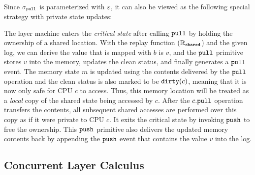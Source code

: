 Since $\sigma_{\mathrm{\texttt{pull}}}$ is parameterized with $\oracle$, it can also be viewed as the following special strategy  with private state updates:%
\begin{center}
\end{center}
The layer machine enters the \emph{critical state} after calling ${\mathrm{\texttt{pull}}}$ by holding the ownership
of a shared location.
With the replay function ($\mathbb{R}_{{\mathrm{\texttt{shared}}}}$) and the given log, 
we can derive the value that is mapped with $b$ is $v$, 
and the ${\mathrm{\texttt{pull}}}$ primitive
stores  $v$  into the memory, updates the clean status,
and finally generates a ${\mathrm{\texttt{pull}}}$ event.
The memory state $m$ is updated using the contents delivered
by the ${\mathrm{\texttt{pull}}}$ operation
and  the clean status is also marked to be ${\mathrm{\texttt{dirty}}}(c)$,
meaning that it is now only safe for CPU $c$ to access.
Thus, this memory location will be treated as
a \emph{local}
copy of the shared state being accessed by $c$.
After the $c.{\mathrm{\texttt{pull}}}$ operation transfers the contents,
all subsequent shared accesses are performed over this 
copy as if it were private to CPU $c$.
It exits the critical state by invoking ${\mathrm{\texttt{push}}}$ to free the ownership.
This ${\mathrm{\texttt{push}}}$ primitive also delivers the updated memory contents back 
by appending the ${\mathrm{\texttt{push}}}$ event that contains the value $v$ into the log.

\subsection{Concurrent Layer Calculus}
\label{boot-linking}

